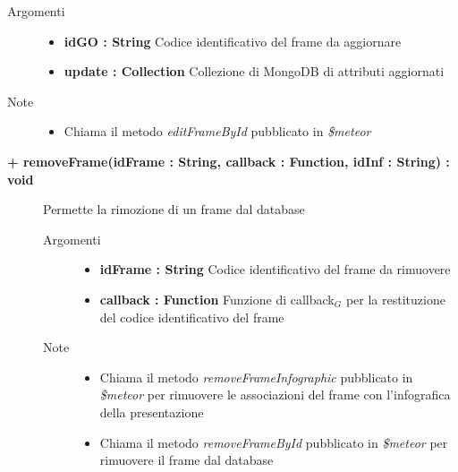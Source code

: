 \begin{description}
\begin{description}
		\begin{description}
			\item[Argomenti] \hfill
				\begin{itemize}
					\item \textbf{idGO : String			} \hfill
					Codice identificativo del frame da aggiornare
					\item \textbf{update : Collection			} \hfill
					Collezione di MongoDB di attributi aggiornati
					
				\end{itemize}
			\item[Note] \hfill
			\begin{itemize}
					\item Chiama il metodo \textit{editFrameById} pubblicato in \textit{\$meteor}
			\end{itemize}
		\end{description}
	\end{description}
	
	\begin{description}
		\item[\textbf{\color{blue}+ removeFrame(idFrame : String, callback : Function, idInf : String) : void			}] \hfill
			Permette la rimozione di un frame dal database
			
		\begin{description}
			\item[Argomenti] \hfill
				\begin{itemize}
					\item \textbf{idFrame : String			} \hfill
					Codice identificativo del frame da rimuovere
					\item \textbf{callback : Function			} \hfill
					Funzione di callback$_G$ per la restituzione del codice identificativo del frame
					
				\end{itemize}
			\item[Note] \hfill
			\begin{itemize}
					\item Chiama il metodo \textit{removeFrameInfographic} pubblicato in \textit{\$meteor} per rimuovere le associazioni del frame con l'infografica della presentazione
					\item Chiama il metodo \textit{removeFrameById} pubblicato in \textit{\$meteor} per rimuovere il frame dal database
			\end{itemize}
		\end{description}
	\end{description}
	

\end{description}
